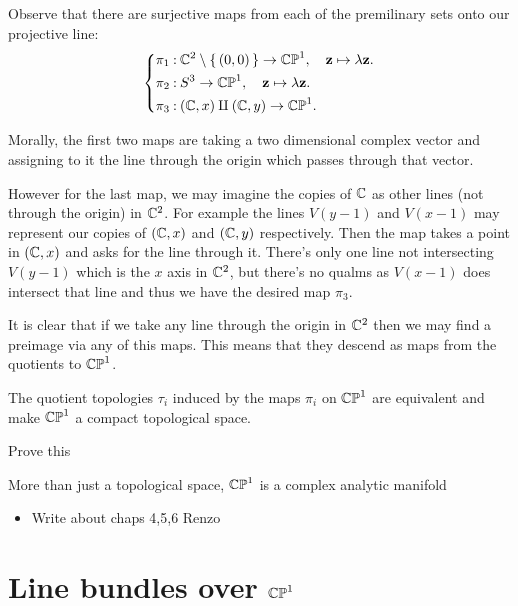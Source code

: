 \documentclass[12pt]{memoir}
\begin{document}
\begin{ptcbp}
\end{ptcbp}

Observe that there are surjective maps from each of the premilinary sets onto our projective line: 
$$
\left\lbrace
\begin{aligned}
    &\pi_1\mathbin{:}\mathbb{C}^2\setminus\{\,(0,0)\,\}\to\mathbb{CP}^1,\quad \mathbf{z}\mapsto \lambda\mathbf{z}.\\
    &\pi_2\mathbin{:}S^3\to\mathbb{CP}^1,\quad \mathbf{z}\mapsto\lambda\mathbf{z}.\\
    &\pi_3\mathbin{:}(\mathbb{C},x)\amalg(\mathbb{C},y)\to\mathbb{CP}^1.
\end{aligned}
\right.
$$

Morally, the first two maps are taking a two dimensional complex vector and assigning to it the line through the origin which passes through that vector.\par
However for the last map, we may imagine the copies of $\mathbb{C}$ as other lines (not through the origin) in $\mathbb{C}^2$. For example the lines $V(y-1)$ and $V(x-1)$ may represent our copies of $(\mathbb{C},x)$ and $(\mathbb{C},y)$ respectively. Then the map takes a point in $(\mathbb{C},x)$ and asks for the line through it. There's only one line not intersecting $V(y-1)$ which is the $x$ axis in $\mathbb{C}^2$, but there's no qualms as $V(x-1)$ does intersect that line and thus we have the desired map $\pi_3$.\par
It is clear that if we take any line through the origin in $\mathbb{C}^2$ then we may find a preimage via any of this maps. This means that they descend as maps from the quotients to $\mathbb{CP}^1$. 

\begin{Th}
    The quotient topologies $\tau_i$ induced by the maps $\pi_i$ on $\mathbb{CP}^1$ are equivalent and make $\mathbb{CP}^1$ a compact topological space.
\end{Th}

\begin{ptcbp}
    Prove this
\end{ptcbp}

More than just a topological space, $\mathbb{CP}^1$ is a complex analytic manifold

\begin{itemize}
    \item Write about chaps 4,5,6 Renzo
\end{itemize}

\section{Line bundles over $\mathbb{CP}^1$}
\end{document}
